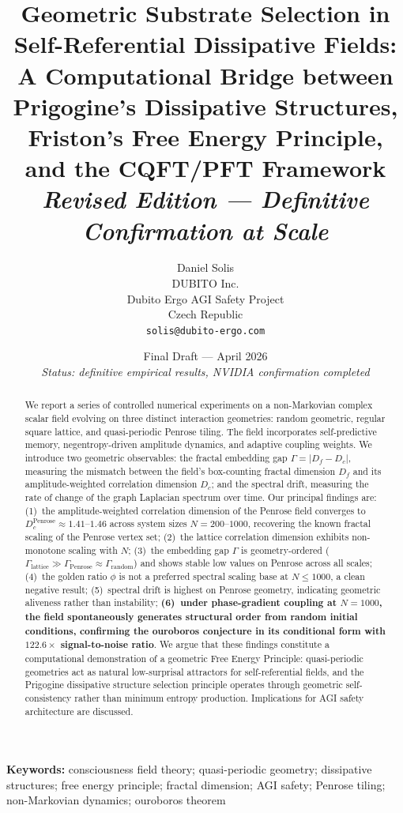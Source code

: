 \documentclass[12pt,a4paper]{article}
\title{%
  \textbf{Geometric Substrate Selection in Self-Referential Dissipative Fields:}\\[4pt]
  \large A Computational Bridge between Prigogine's Dissipative Structures,\\
  Friston's Free Energy Principle, and the CQFT/PFT Framework\\[8pt]
  \large \textit{Revised Edition --- Definitive Confirmation at Scale}
}
\author{%
  Daniel Solis\\[4pt]
  \small DUBITO Inc.\\
  \small Dubito Ergo AGI Safety Project\\
  \small Czech Republic\\[4pt]
  \small \texttt{solis@dubito-ergo.com}
}
\date{%
  \small Final Draft --- April 2026\\
  \small \textit{Status: definitive empirical results, NVIDIA confirmation completed}
}
\theoremstyle{plain}
\theoremstyle{definition}
\begin{document}
\maketitle
\thispagestyle{empty}

\begin{abstract}
We report a series of controlled numerical experiments on a non-Markovian complex
scalar field evolving on three distinct interaction geometries: random geometric,
regular square lattice, and quasi-periodic Penrose tiling. The field incorporates
self-predictive memory, negentropy-driven amplitude dynamics, and adaptive coupling
weights. We introduce two geometric observables: the fractal embedding gap
$\Gamma = |D_f - D_c|$, measuring the mismatch between the field's box-counting
fractal dimension $D_f$ and its amplitude-weighted correlation dimension $D_c$;
and the spectral drift, measuring the rate of change of the graph Laplacian
spectrum over time. Our principal findings are: (1)~the amplitude-weighted
correlation dimension of the Penrose field converges to
$D_c^{\text{Penrose}} \approx 1.41$--$1.46$ across system sizes $N = 200$--$1000$,
recovering the known fractal scaling of the Penrose vertex set; (2)~the lattice
correlation dimension exhibits non-monotone scaling with $N$; (3)~the embedding
gap $\Gamma$ is geometry-ordered
($\Gamma_{\text{lattice}} \gg \Gamma_{\text{Penrose}} \approx \Gamma_{\text{random}}$)
and shows stable low values on Penrose across all scales; (4)~the golden ratio
$\phi$ is not a preferred spectral scaling base at $N \leq 1000$, a clean negative
result; (5)~spectral drift is highest on Penrose geometry, indicating geometric
aliveness rather than instability; \textbf{(6)~under phase-gradient coupling at
$N=1000$, the field spontaneously generates structural order from random initial
conditions, confirming the ouroboros conjecture in its conditional form with
$122.6\times$ signal-to-noise ratio}. We argue that these findings constitute a
computational demonstration of a geometric Free Energy Principle: quasi-periodic
geometries act as natural low-surprisal attractors for self-referential fields,
and the Prigogine dissipative structure selection principle operates through
geometric self-consistency rather than minimum entropy production. Implications
for AGI safety architecture are discussed.
\end{abstract}

\vspace{1em}
\noindent\textbf{Keywords:} consciousness field theory; quasi-periodic geometry;
dissipative structures; free energy principle; fractal dimension; AGI safety;
Penrose tiling; non-Markovian dynamics; ouroboros theorem
\end{document}
